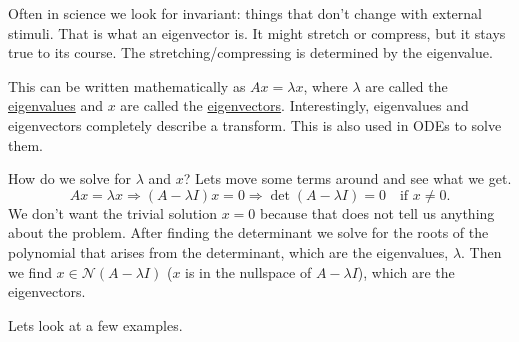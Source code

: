 \documentclass[reqno]{amsart}
\theoremstyle{definition}
\begin{document}
Often in science we look for invariant: things that don't change with external stimuli.  That is what an eigenvector is.  It might stretch or compress, but it stays true to its course.  The stretching/compressing is determined by the eigenvalue.

This can be written mathematically as $Ax = \lambda x$, where $\lambda$ are called the \underline{eigenvalues} and $x$ are called the \underline{eigenvectors}.  Interestingly, eigenvalues and eigenvectors completely describe a transform.  This is also used in ODEs to solve them.

{\color{red} How do we solve for $\lambda$ and $x$?}  Lets move some terms around and see what we get.
%
\begin{equation*}
Ax = \lambda x \Rightarrow (A-\lambda I)x = 0 \Rightarrow \det(A-\lambda I) = 0 \quad \text{if $x\neq 0$}.
\end{equation*}
%
We don't want the trivial solution $x=0$ because that does not tell us anything about the problem.
After finding the determinant we solve for the roots of the polynomial that arises from the determinant, which are the eigenvalues, $\lambda$.  Then we find $x \in \mathcal{N}(A-\lambda I)$ ($x$ is in the nullspace of $A-\lambda I$), which are the eigenvectors.

\pagebreak

Lets look at a few examples.
\end{document}
